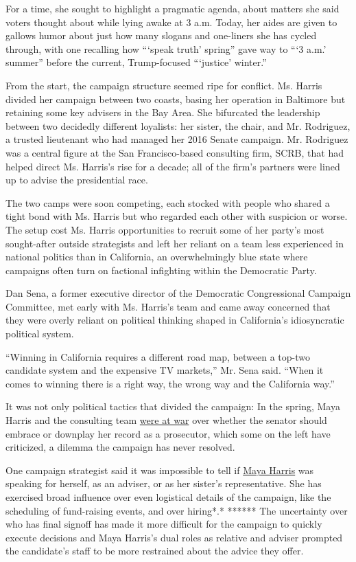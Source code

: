 For a time, she sought to highlight a pragmatic agenda, about matters
she said voters thought about while lying awake at 3 a.m. Today, her
aides are given to gallows humor about just how many slogans and
one-liners she has cycled through, with one recalling how ```speak
truth' spring'' gave way to ```3 a.m.' summer'' before the current,
Trump-focused ```justice' winter.''

From the start, the campaign structure seemed ripe for conflict. Ms.
Harris divided her campaign between two coasts, basing her operation in
Baltimore but retaining some key advisers in the Bay Area. She
bifurcated the leadership between two decidedly different loyalists: her
sister, the chair, and Mr. Rodriguez, a trusted lieutenant who had
managed her 2016 Senate campaign. Mr. Rodriguez was a central figure at
the San Francisco-based consulting firm, SCRB, that had helped direct
Ms. Harris's rise for a decade; all of the firm's partners were lined up
to advise the presidential race.

The two camps were soon competing, each stocked with people who shared a
tight bond with Ms. Harris but who regarded each other with suspicion or
worse. The setup cost Ms. Harris opportunities to recruit some of her
party's most sought-after outside strategists and left her reliant on a
team less experienced in national politics than in California, an
overwhelmingly blue state where campaigns often turn on factional
infighting within the Democratic Party.

Dan Sena, a former executive director of the Democratic Congressional
Campaign Committee, met early with Ms. Harris's team and came away
concerned that they were overly reliant on political thinking shaped in
California's idiosyncratic political system.

``Winning in California requires a different road map, between a top-two
candidate system and the expensive TV markets,'' Mr. Sena said. ``When
it comes to winning there is a right way, the wrong way and the
California way.''

It was not only political tactics that divided the campaign: In the
spring, Maya Harris and the consulting team
\href{https://www.nytimes.com/2019/05/08/us/politics/kamala-harris-2020-trump.html}{were
at war} over whether the senator should embrace or downplay her record
as a prosecutor, which some on the left have criticized, a dilemma the
campaign has never resolved.

One campaign strategist said it was impossible to tell if
\href{https://www.nytimes.com/2019/05/08/us/politics/kamala-harris-2020-trump.html}{Maya
Harris} was speaking for herself, as an adviser, or as her sister's
representative. She has exercised broad influence over even logistical
details of the campaign, like the scheduling of fund-raising events, and
over hiring*.* ****** The uncertainty over who has final signoff has
made it more difficult for the campaign to quickly execute decisions and
Maya Harris's dual roles as relative and adviser prompted the
candidate's staff to be more restrained about the advice they offer.

